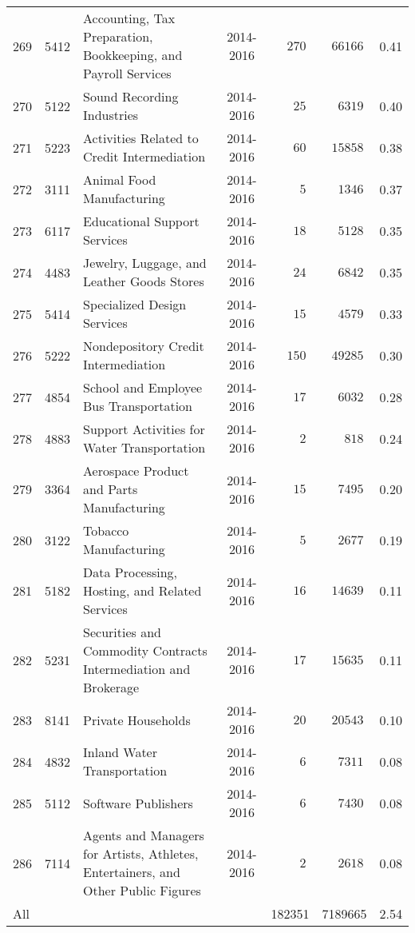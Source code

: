 \documentclass[9pt, oneside]{article}   	%
\begin{document}
\begin{longtable}{lcp{3in}cccc}
269  & 5412 & Accounting, Tax Preparation, Bookkeeping, and Payroll Services & 2014-2016 & $\phantom{00}270$ & $\phantom{0}66166$ &  0.41 \\
270  & 5122 & Sound Recording Industries & 2014-2016 & $\phantom{000}25$ & $\phantom{00}6319$ &  0.40 \\
271  & 5223 & Activities Related to Credit Intermediation & 2014-2016 & $\phantom{000}60$ & $\phantom{0}15858$ &  0.38 \\
272  & 3111 & Animal Food Manufacturing & 2014-2016 & $\phantom{0000}5$ & $\phantom{00}1346$ &  0.37 \\
273  & 6117 & Educational Support Services & 2014-2016 & $\phantom{000}18$ & $\phantom{00}5128$ &  0.35 \\
274  & 4483 & Jewelry, Luggage, and Leather Goods Stores & 2014-2016 & $\phantom{000}24$ & $\phantom{00}6842$ &  0.35 \\
275  & 5414 & Specialized Design Services & 2014-2016 & $\phantom{000}15$ & $\phantom{00}4579$ &  0.33 \\
276  & 5222 & Nondepository Credit Intermediation & 2014-2016 & $\phantom{00}150$ & $\phantom{0}49285$ &  0.30 \\
277  & 4854 & School and Employee Bus Transportation & 2014-2016 & $\phantom{000}17$ & $\phantom{00}6032$ &  0.28 \\
278  & 4883 & Support Activities for Water Transportation & 2014-2016 & $\phantom{0000}2$ & $\phantom{000}818$ &  0.24 \\
279  & 3364 & Aerospace Product and Parts Manufacturing & 2014-2016 & $\phantom{000}15$ & $\phantom{00}7495$ &  0.20 \\
280  & 3122 & Tobacco Manufacturing & 2014-2016 & $\phantom{0000}5$ & $\phantom{00}2677$ &  0.19 \\
281  & 5182 & Data Processing, Hosting, and Related Services & 2014-2016 & $\phantom{000}16$ & $\phantom{0}14639$ &  0.11 \\
282  & 5231 & Securities and Commodity Contracts Intermediation and Brokerage & 2014-2016 & $\phantom{000}17$ & $\phantom{0}15635$ &  0.11 \\
283  & 8141 & Private Households & 2014-2016 & $\phantom{000}20$ & $\phantom{0}20543$ &  0.10 \\
284  & 4832 & Inland Water Transportation & 2014-2016 & $\phantom{0000}6$ & $\phantom{00}7311$ &  0.08 \\
285  & 5112 & Software Publishers & 2014-2016 & $\phantom{0000}6$ & $\phantom{00}7430$ &  0.08 \\
286  & 7114 & Agents and Managers for Artists, Athletes, Entertainers, and Other Public Figures & 2014-2016 & $\phantom{0000}2$ & $\phantom{00}2618$ &  0.08 \\

\cline{1-1} \cline{2-2} \cline{3-3} \cline{4-4} \cline{5-5}  \cline{6-6} \cline{7-7}%
All  & & &  &  182351& 7189665 &  2.54\\

\hline 
\end{longtable}
\end{document}
